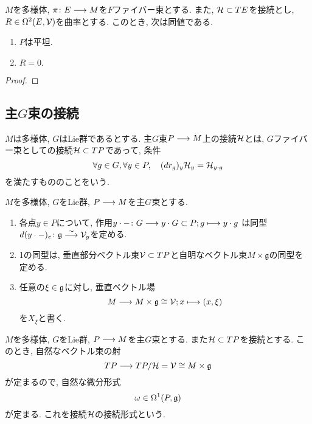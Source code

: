 \begin{thm}
$M$を多様体, $\pi \colon E \longrightarrow M$を$F$ファイバー束とする.
また, $\mathcal{H} \subset TE$を接続とし,
$R \in \Omega^2(E, \mathcal{V})$を曲率とする.
このとき, 次は同値である.
\begin{enumerate}
\item
$P$は平坦.
\item
$R = 0.$
\end{enumerate}
\end{thm}

\begin{proof}

\end{proof}

\subsection{主$G$束の接続}
\begin{dfn}[主$G$束の接続]
$M$は多様体, $G$はLie群であるとする.
主$G$束$P \longrightarrow M$上の接続$\mathcal{H}$とは,
$G$ファイバー束としての接続$\mathcal{H} \subset TP$であって, 条件
\begin{equation}
\forall g \in G, \forall y \in P, \quad
(dr_g)_y \mathcal{H}_y = \mathcal{H}_{y \cdot g}
\end{equation}
を満たすもののことをいう.
\end{dfn}

\begin{rem}
$M$を多様体, $G$をLie群,
$P \longrightarrow M$を主$G$束とする.
\begin{enumerate}
\item
各点$y \in P$について,
作用$y \cdot - \colon G \longrightarrow y \cdot G \subset P; g \longmapsto y \cdot g$
は同型$d(y \cdot -)_e \colon \mathfrak{g} \stackrel{\sim}{\longrightarrow} \mathcal{V}_y$を定める.
\item
1の同型は, 垂直部分ベクトル束$\mathcal{V} \subset TP$と自明なベクトル束$M \times \mathfrak{g}$の同型を定める.
\item
任意の$\xi \in \mathfrak{g}$に対し, 垂直ベクトル場
\begin{equation}
M \longrightarrow M \times \mathfrak{g} \cong \mathcal{V}; x \longmapsto (x, \xi)
\end{equation}
を$X_\xi$と書く.
\end{enumerate}
\end{rem}

\begin{dfn}[接続形式]
$M$を多様体, $G$をLie群,
$P \longrightarrow M$を主$G$束とする.
また$\mathcal{H} \subset TP$を接続とする.
このとき, 自然なベクトル束の射
\begin{equation}
TP \longrightarrow TP / \mathcal{H} = \mathcal{V} \cong M \times \mathfrak{g}
\end{equation}
が定まるので, 自然な微分形式
\begin{equation}
  \omega \in \Omega^1(P, \mathfrak{g})
\end{equation}
が定まる.
これを接続$\mathcal{H}$の接続形式という.
\end{dfn}

